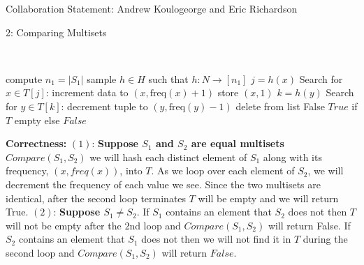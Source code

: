 \documentclass[12pt]{article}
\begin{document}

Collaboration Statement: Andrew Koulogeorge and Eric Richardson 

\begin{problem}{2: Comparing Multisets}
\end{problem}
\begin{solution} \ \\

\begin{answerbox}
\begin{algorithmic}
    \State compute $n_1 = |S_1|$
    \State sample $h \in H$ such that $h: N \rightarrow [n_1]$
        \State $j = h(x)$
        \State Search for $x \in T[j]$:
            \State increment data to $(x, \text{freq}(x) + 1)$
        \Else
            \State store $(x, 1)$
        \EndIf
    \EndFor
        \State $k = h(y)$
        \State Search for $y \in T[k]$: 
            \State decrement tuple to $(y, \text{freq}(y) - 1)$
                \State delete from list
            \EndIf
        \Else
            \State \Return False
        \EndIf
    \EndFor
    \State \Return $True$ if $T$ empty else $False$
\EndProcedure
\end{algorithmic}
\end{answerbox}
\textbf{Correctness:} $(1)$: \textbf{Suppose $S_1$ and $S_2$ are equal multisets} $Compare(S_1,S_2)$ we will hash each distinct element of $S_1$ along with its frequency, $(x,freq(x))$, into $T$. As we loop over each element of $S_2$, we will decrement the frequency of each value we see. Since the two multisets are identical, after the second loop terminates $T$ will be empty and we will return True. $(2)$: \textbf{Suppose $S_1 \neq S_2$}. If $S_1$ contains an element that $S_2$ does not then $T$ will not be empty after the $2$nd loop and $Compare(S_1,S_2)$ will return False. If $S_2$ contains an element that $S_1$ does not then we will not find it in $T$ during the second loop and $Compare(S_1,S_2)$ will return $False$.\\


\end{solution}
\end{document}
